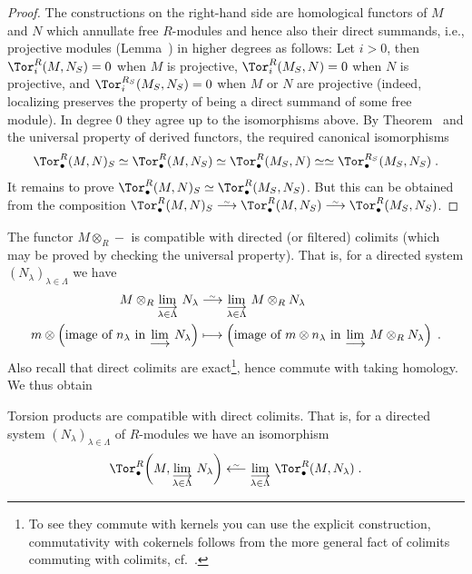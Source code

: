 \documentclass[a4paper,parskip=half,numbers=enddot, DIV=12]{scrreprt}
\begin{document}
\begin{proof}
	The constructions on the right-hand side are homological functors of $M$ and $N$ which annullate free $R$-modules and hence also their direct summands, i.e., projective modules (Lemma~) in higher degrees as follows: Let $i>0$, then $\Tor_i^R(M,N_S)=0$ when $M$ is projective, $\Tor_i^R(M_S,N)=0$ when $N$ is projective, and $\Tor_i^{R_S}(M_S,N_S)=0$ when $M$ or $N$ are projective (indeed, localizing preserves the property of being a direct summand of some free module). In degree $0$ they agree up to the isomorphisms above. By Theorem~ and the universal property of derived functors, the required canonical isomorphisms
	\begin{align*}
		\Tor_\bullet^R(M,N)_S\simeq \Tor_\bullet^R(M,N_S)\simeq \Tor_\bullet^R(M_S,N)\simeq \simeq \Tor_\bullet^{R_S}(M_S,N_S)\;.
	\end{align*}
	It remains to prove $\Tor_\bullet^R(M,N)_S\simeq \Tor_\bullet^R(M_S,N_S)$. But this can be obtained from the composition $\Tor_\bullet^R(M,N)_S\isomorphism \Tor_\bullet^R(M,N_S)\isomorphism \Tor_\bullet^R(M_S,N_S)$.
\end{proof}
The functor $M\otimes_R-$ is compatible with directed (or filtered) colimits (which may be proved by checking the universal property). That is, for a directed system $(N_\lambda)_{\lambda\in\Lambda}$ we have
\begin{align*}
	M\otimes_R\colimit[\lambda\in\Lambda]N_\lambda&\isomorphism \colimit[\lambda\in\Lambda]M\otimes_RN_\lambda\\
	m\otimes\left(\text{image of }n_\lambda\text{ in }\colimit N_\lambda\right)&\longmapsto \left(\text{image of }m\otimes n_\lambda\text{ in }\colimit M\otimes_RN_\lambda\right)\;.
\end{align*}
Also recall that direct colimits are exact\footnote{To see they commute with kernels you can use the explicit construction, commutativity with cokernels follows from the more general fact of colimits commuting with colimits, cf.\ \cite[Lemma~A.1.4]{alggeo2}.}, hence commute with taking homology. We thus obtain
\begin{fact}
	Torsion products are compatible with direct colimits. That is, for a directed system $(N_\lambda)_{\lambda\in\Lambda}$ of $R$-modules we have an isomorphism
	\begin{align*}
		\Tor_\bullet^R\bigg(M,\colimit[\lambda\in\Lambda]N_\lambda\bigg)\lisomorphism \colimit[\lambda\in\Lambda]\Tor_\bullet^R(M,N_\lambda)\;.
	\end{align*}
\end{fact}
\end{document}

